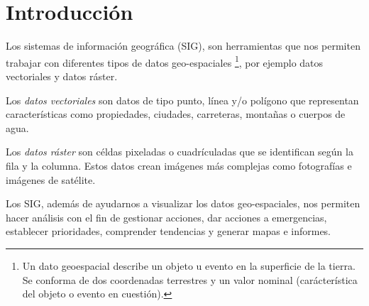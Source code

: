 
\section{Introducción}

Los sistemas de información geográfica (SIG), son herramientas que nos permiten
trabajar con diferentes tipos de datos geo-espaciales \footnote{Un dato
geoespacial describe un objeto u evento en la superficie de la tierra. Se
conforma de dos coordenadas terrestres y un valor nominal (carácterística del
objeto o evento en cuestión).}, por ejemplo datos vectoriales y datos ráster.

Los \textit{datos vectoriales} son datos de tipo punto, línea y/o polígono que
representan características como propiedades, ciudades, carreteras, montañas o
cuerpos de agua.

Los \textit{datos ráster} son céldas pixeladas o cuadrículadas que se
identifican según la fila y la columna. Estos datos crean imágenes más complejas
como fotografías e imágenes de satélite.

Los SIG, además de ayudarnos a visualizar los datos geo-espaciales, nos permiten
hacer análisis con el fin de gestionar acciones, dar acciones a emergencias,
establecer prioridades, comprender tendencias y generar mapas e informes.
